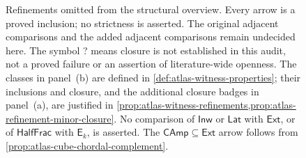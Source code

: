 \begin{figure}[p]
{}
\caption{Refinements omitted from the structural overview.
Every arrow is a proved inclusion; no strictness is asserted.
The original adjacent comparisons and the added adjacent comparisons
remain undecided here. The symbol \textsf{?} means closure is not
established in this audit, not a proved failure or an assertion of
literature-wide openness. The classes in panel~(b) are defined in
\cref{def:atlas-witness-properties}; their inclusions and closure,
and the additional closure badges in panel~(a), are justified in
\cref{prop:atlas-witness-refinements,prop:atlas-refinement-minor-closure}.
No comparison of $\mathsf{Inw}$ or $\mathsf{Lat}$ with $\mathsf{Ext}$,
or of $\mathsf{HalfFrac}$ with $\mathsf E_k$, is asserted.
The $\mathsf{CAmp}\subseteq\mathsf{Ext}$ arrow follows from
\cref{prop:atlas-cube-chordal-complement}.}
\label{fig:allocation-refinements}
\end{figure}
